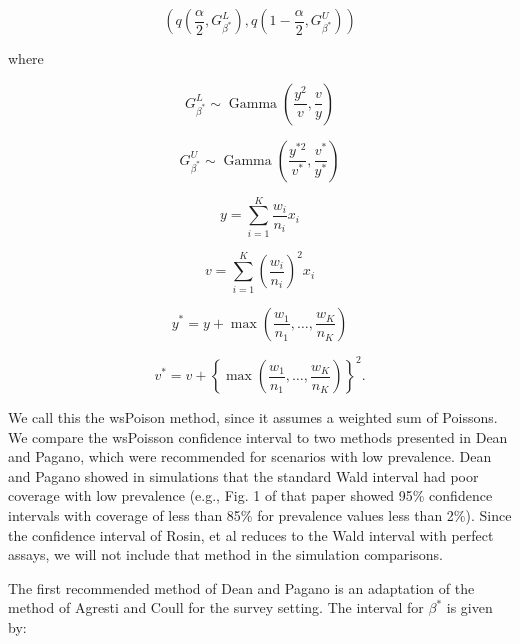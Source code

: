 \documentclass[AMA,STIX1COL]{WileyNJD-v2}
\begin{document}
\begin{equation}
    \left( q\left( \frac{\alpha}{2}, G_{\beta^*}^L \right), q \left( 1 - \frac{\alpha}{2},  G_{\beta^*}^U \right) \right)
\end{equation}


where

\begin{equation*}
    G_{\beta^*}^L \sim \operatorname{Gamma}\left( \frac{y^2}{v}, \frac{v}{y} \right)
\end{equation*}

\begin{equation*}
    G_{\beta^*}^U \sim \operatorname{Gamma}\left( \frac{y^{*2}}{v^*}, \frac{v^*}{y^*} \right)
\end{equation*}

\begin{equation*}
    y = \sum_{i=1}^K \frac{w_i}{n_i} x_i
\end{equation*}

\begin{equation*}
    v = \sum_{i=1}^K \left( \frac{w_i}{n_i}\right)^2 x_i
\end{equation*}

\begin{equation*}
    y^* = y + \max\left(\frac{w_1}{n_1}, \ldots, \frac{w_K}{n_K} \right)
\end{equation*}

\begin{equation*}
    v^* = v + \left\{ \max\left(\frac{w_1}{n_1}, \ldots, \frac{w_K}{n_K} \right) \right\}^2.
\end{equation*}

We call this the wsPoison method, since it assumes a weighted sum of Poissons.
We compare the wsPoisson confidence interval to two methods presented in Dean and Pagano\cite{Dean:2015}, which were recommended for scenarios with low prevalence.
Dean and Pagano showed in simulations that the standard Wald interval had poor coverage with low prevalence (e.g., Fig. 1 of that paper showed 95\% confidence intervals with coverage of less than 85\% for prevalence values less than 2\%).
Since the confidence interval of Rosin, et al \cite{rosin2021estimating} reduces to the Wald interval with perfect assays, we will not include that method in the simulation comparisons.

The first recommended method of Dean and Pagano is an adaptation of the method of Agresti and Coull\cite{AgrestiCoull} for the survey setting.
The interval for \( \beta^* \) is given by:
\end{document}
